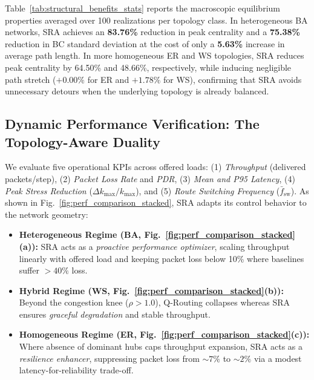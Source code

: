 \documentclass{ccjnl}
\newcommand{\rev}[1]{#1}
\def\rev#1{#1}%
\def\kappa{k}%
\begin{document}
Table~\ref{tab:structural_benefits_stats} reports the macroscopic equilibrium properties averaged over 100 realizations per topology class. In heterogeneous BA networks, SRA achieves an \textbf{83.76\%} reduction in peak centrality and a \textbf{75.38\%} reduction in BC standard deviation at the cost of only a \textbf{5.63\%} increase in average path length. In more homogeneous ER and WS topologies, SRA reduces peak centrality by 64.50\% and 48.66\%, respectively, while inducing negligible path stretch ($+0.00\%$ for ER and $+1.78\%$ for WS), confirming that SRA avoids unnecessary detours when the underlying topology is already balanced.

\subsection{Dynamic Performance Verification: The Topology-Aware Duality}
\label{subsec:dynamic_performance}

\rev{We evaluate five operational KPIs across offered loads: (1) \textit{Throughput} (delivered packets/step), (2) \textit{Packet Loss Rate} and \textit{PDR}, (3) \textit{Mean and P95 Latency}, (4) \textit{Peak Stress Reduction} ($\Delta \kappa_{\max}/\kappa_{\max}$), and (5) \textit{Route Switching Frequency} ($\bar{f}_{\text{sw}}$).} As shown in Fig.~\ref{fig:perf_comparison_stacked}, SRA adapts its control behavior to the network geometry:
\begin{itemize}
    \item \textbf{Heterogeneous Regime (BA, Fig.~\ref{fig:perf_comparison_stacked}(a)):} SRA acts as a \textit{proactive performance optimizer}, scaling throughput linearly with offered load and keeping packet loss below 10\% where baselines suffer $>40\%$ loss.
    \item \textbf{Hybrid Regime (WS, Fig.~\ref{fig:perf_comparison_stacked}(b)):} Beyond the congestion knee ($\rho > 1.0$), Q-Routing collapses whereas SRA ensures \textit{graceful degradation} and stable throughput.
    \item \textbf{Homogeneous Regime (ER, Fig.~\ref{fig:perf_comparison_stacked}(c)):} Where absence of dominant hubs caps throughput expansion, SRA acts as a \textit{resilience enhancer}, suppressing packet loss from $\sim 7\%$ to $\sim 2\%$ via a modest latency-for-reliability trade-off.
\end{itemize}
\end{document}
